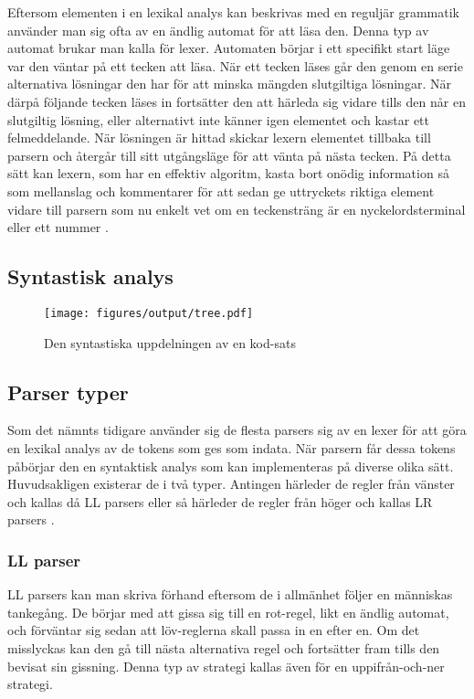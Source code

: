 Eftersom elementen i en lexikal analys kan beskrivas med en reguljär grammatik
använder man sig ofta av en ändlig automat för att läsa den. Denna typ av
automat brukar man kalla för lexer. Automaten börjar i ett specifikt start
läge var den väntar på ett tecken att läsa. När ett tecken läses går den genom
en serie alternativa lösningar den har för att minska mängden slutgiltiga
lösningar. När därpå följande tecken läses in fortsätter den att härleda sig
vidare tills den når en slutgiltig lösning, eller alternativt inte känner igen
elementet och kastar ett felmeddelande. När lösningen är hittad skickar lexern
elementet tillbaka till parsern och återgår till sitt utgångsläge för att
vänta på nästa tecken. På detta sätt kan lexern, som har en effektiv
algoritm, kasta bort onödig information så som mellanslag och kommentarer för
att sedan ge uttryckets riktiga element vidare till parsern som nu enkelt vet
om en teckensträng är en nyckelordsterminal eller ett nummer \citep[s.
51]{sm09}.

\subsection{Syntastisk analys}

\begin{figure}[ht]
  \texttt{[image: figures/output/tree.pdf]}
  \caption{Den syntastiska uppdelningen av en kod-sats}
\end{figure}

\subsection{Parser typer}

Som det nämnts tidigare använder sig de flesta parsers sig av en lexer för att
göra en lexikal analys av de tokens som ges som indata. När parsern får dessa
tokens påbörjar den en syntaktisk analys som kan implementeras på diverse
olika sätt. Huvudsakligen existerar de i två typer. Antingen härleder de
regler från vänster och kallas då LL parsers eller så härleder de regler från
höger och kallas LR parsers \citep[s. 67]{sm09}.

\subsubsection{LL parser}

LL parsers kan man skriva förhand eftersom de i allmänhet följer en människas
tankegång. De börjar med att gissa sig till en rot-regel, likt en ändlig
automat, och förväntar sig sedan att löv-reglerna skall passa in en efter en.
Om det misslyckas kan den gå till nästa alternativa regel och fortsätter
fram tills den bevisat sin gissning. Denna typ av strategi kallas även för en
uppifrån-och-ner strategi.

